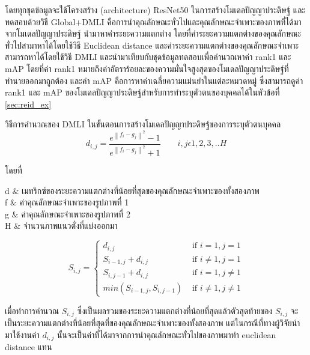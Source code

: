 โดยทุกชุดข้อมูลจะใช้โครงสร้าง (architecture) ResNet50 ในการสร้างโมเดลปัญญาประดิษฐ์ และทดสอบด้วยวิธี Global+DMLI คือการนำคุณลักษณะทั่วไปและคุณลักษณะจำเพาะของภาพที่ได้มาจากโมเดลปัญญาประดิษฐ์ นำมาหาค่าระยะความแตกต่าง โดยที่ค่าระยะความแตกต่างของคุณลักษณะทั่วไปสามาหาได้โดยใช้วิธี Euclidean distance และค่าระยะความแตกต่างของคุณลักษณะจำเพาะสามารถหาได้โดยใช้วิธี DMLI และนำมาเทียบกับชุดข้อมูลทดสอบเพื่อคำนวณหาค่า rank1 และ mAP โดยที่ค่า rank1 หมายถึงค่าอัตราร้อยละของความมั่นใจสูงสุดของโมเดลปัญญาประดิษฐ์ที่ทำนายออกมาถูกต้อง 
และค่า mAP คือการหาค่าเฉลี่ยความแม่นยำในแต่ละหมวดหมู่ ซึ่งสามารถดูค่า rank1 และ mAP ของโมเดลปัญญาประดิษฐ์สำหรับการทำระบุตัวตนของบุคคลได้ในหัวข้อที่ \ref{sec:reid_ex}

วิธีการคำนวณของ DMLI ในขั้นตอนการสร้างโมเดลปัญญาประดิษฐ์ของการระบุตัวตนบุคคล
\begin{equation}
d_{i,j} = \frac{e^{\left \| f_{i} - g_{j} \right \|^{2}} - 1}{e^{\left \| f_{i} - g_{j} \right \|^{2}} + 1} \qquad i,j \epsilon 1,2,3,..H
\end{equation}

โดยที่
\begin{conditions}
d		&		เมทริกซ์ของระยะความแตกต่างที่น้อยที่สุดของคุณลักษณะจำเพาะของทั้งสองภาพ			\\
f		&		ค่าคุณลักษณะจำเพาะของรูปภาพที่ 1				\\
g		&		ค่าคุณลักษณะจำเพาะของรูปภาพที่ 2				\\
H		&		จำนวนภาพแนวตั่งที่แบ่งออกมา
\end{conditions}

\begin{equation}
S_{i,j} = \begin{cases}
d_{i,j} & \text{ if } i=1,j=1 \\ 
S_{i-1,j}+d_{i,j} & \text{ if } i\neq 1,j=1 \\ 
S_{i,j-1}+d_{i,j} & \text{ if } i=1,j\neq1 \\ 
min(S_{i-1,j},S_{i,j-1}) & \text{ if } i\neq1,j\neq1 
\end{cases}
\end{equation}

เมื่อทำการคำนวณ $S_{i,j}$ ซึ่งเป็นผลรวมของระยะความแตกต่างที่น้อยที่สุดแล้วตัวสุดท้ายของ $S_{i,j}$ จะเป็นระยะความแตกต่างที่น้อยที่สุดที่ของคุณลักษณะจำเพาะของทั้งสองภาพ แต่ในกรณีที่ทางผู้วิจัยนำมาใช้งานค่า $d_{i,j}$ นั้นจะเป็นค่าที่ได้มาจากการนำคุณลักษณะทั่วไปของภาพมาทำ euclidean distance แทน
